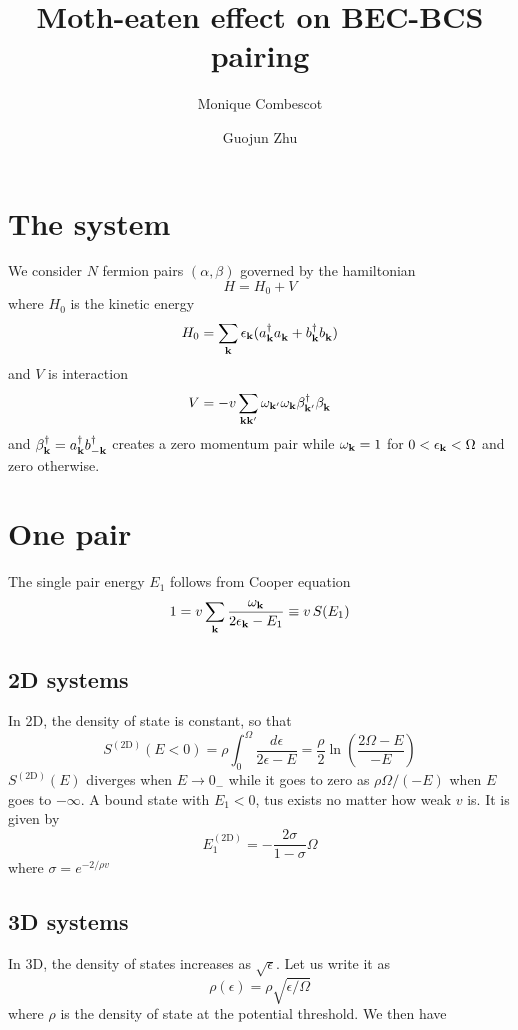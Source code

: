 \documentclass{article}
\author{Monique Combescot \and Guojun Zhu}
\title{Moth-eaten effect on BEC-BCS pairing}
\begin{document}
\maketitle
{}
\section{The system}
We consider $N$ fermion pairs $(\alpha,\beta)$ governed by the hamiltonian
\begin{equation}
H=H_{0}+V
\end{equation}
where $H_0$ is the kinetic energy 
\begin{equation}
H_0=\sum_{\mathbf{k}}\epsilon_{\mathbf{k}}(a^\dagger_{\mathbf{k}}{}a^{}_{\mathbf{k}}+b^\dagger_{\mathbf{k}}{}b^{}_{\mathbf{k}})
\label{eq:}
\end{equation}
and $V$ is interaction
\begin{equation}
V=-v\sum_{\mathbf{k}\mathbf{k}'}\omega_{\mathbf{k}'}\omega_{\mathbf{k}}\beta^\dagger_{\mathbf{k}'}{}\beta^{}_{\mathbf{k}}
\label{eq:}
\end{equation}
and $\beta^\dagger_{\mathbf{k}}=a^\dagger_{\mathbf{k}}b^\dagger_{-\mathbf{k}}$ creates a zero momentum pair while $\omega_{\mathbf{k}}=1$ for $0<\epsilon_{\mathbf{k}}<\Omega$ and zero otherwise.  
\section{One pair}
The single pair energy $E_1$ follows from Cooper equation
\begin{equation}
1=v\sum_{\mathbf{k}}\frac{\omega_{\mathbf{k}}}{2\epsilon_{\mathbf{k}}-E_1}\equiv{}v\,S(E_1)
\label{eq:}
\end{equation}
\subsection{2D systems}
In 2D, the density of state is constant, so that 
\begin{equation}
S^{(\text{2D})}(E<0)=\rho\int_0^{\Omega}\frac{d\epsilon}{2\epsilon-E}=\frac{\rho}{2}\ln\left(\frac{2\Omega-E}{-E}\right)
\label{eq:}
\end{equation}
$S^{(\text{2D})}(E)$ diverges when $E\rightarrow{}0_{-}$ while it goes to zero as $\rho\Omega/(-E)$ when $E$ goes to $-\infty$. A bound state with $E_1<0$, tus exists no matter how weak $v$ is. It is given by 
\begin{equation}
E_1^{(\text{2D})}=-\frac{2\sigma}{1-\sigma}\Omega
\label{eq:}
\end{equation}
where $\sigma=e^{-2/\rho{v}}$
\subsection{3D systems}
In 3D, the density of states increases as $\sqrt{\epsilon}$. Let us write it as 
\begin{equation}
\rho(\epsilon)=\rho\sqrt{\epsilon/\Omega}
\label{eq:}
\end{equation}
where $\rho$ is the density of state at the potential threshold. We then have
\end{document}
